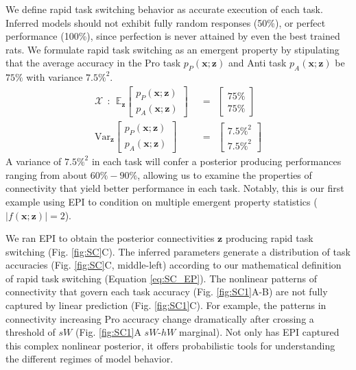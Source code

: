 \documentclass[11pt]{article}
\begin{document}
We define rapid task switching behavior as accurate execution of each task.  Inferred models should not exhibit fully random responses (50\%), or perfect performance (100\%), since perfection is never attained by even the best trained rats.
We formulate rapid task switching as an emergent property by stipulating that the average accuracy in the Pro task $p_P(\mathbf{x}; \mathbf{z})$ and Anti task $p_A(\mathbf{x}; \mathbf{z})$ be $75\%$ with variance $7.5\%^2$.
\begin{equation}\label{eq:SC_EP}
\begin{split}
\mathcal{X} ~~:~~ \mathbb{E}_{\mathbf{z}}\begin{bmatrix} p_P(\mathbf{x}; \mathbf{z}) \\ p_A(\mathbf{x}; \mathbf{z}) \end{bmatrix}  &~~=~~  \begin{bmatrix} 75\% \\ 75\% \end{bmatrix}  \\ 
 \text{Var}_{\mathbf{z}}\begin{bmatrix} p_P(\mathbf{x}; \mathbf{z}) \\ p_A(\mathbf{x}; \mathbf{z}) \end{bmatrix}  &~~=~~  \begin{bmatrix} 7.5\%^2 \\ 7.5\%^2  \end{bmatrix}
\end{split}
\end{equation}
A variance of $7.5\%^2$  in each task will confer a posterior producing performances ranging from about $60\%-90\%$, allowing us to examine the properties of connectivity that yield better performance in each task.
Notably, this is our first example using EPI to condition on multiple emergent property statistics ($|f(\mathbf{x}; \mathbf{z})| = 2$).

We ran EPI to obtain the posterior connectivities $\mathbf{z}$ producing rapid task switching (Fig. \ref{fig:SC}C).
The inferred parameters generate a distribution of task accuracies (Fig. \ref{fig:SC}C, middle-left) according to our mathematical definition of rapid task switching (Equation \ref{eq:SC_EP}).
The nonlinear patterns of connectivity that govern each task accuracy (Fig. \ref{fig:SC1}A-B) are not fully captured by linear prediction (Fig. \ref{fig:SC1}C).
For example, the patterns in connectivity increasing Pro accuracy change dramatically after crossing a threshold of $sW$ (Fig. \ref{fig:SC1}A $sW$-$hW$ marginal).
Not only has EPI captured this complex nonlinear posterior, it offers probabilistic tools for understanding the different regimes of model behavior.
\end{document}
